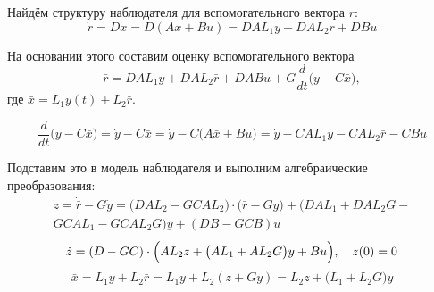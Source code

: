 \documentclass[preprint,russian,a5paper,10pt,twoside,mediummath]{ncc}
\begin{document}
Найдём структуру наблюдателя для вспомогательного вектора $r$: 
\[ \dot{r} = D\dot{x} = D(Ax+Bu) = DAL_1y + DAL_2r + DBu \]

На основании этого составим оценку вспомогательного вектора 
\[ \dot{\bar{r}} = DAL_1y + DAL_2\bar{r} + DABu + G \frac{d}{dt} \bigl( y - C \bar{x} \bigr), \]
где $ \bar{x} = L_1y(t) + L_2\bar{r} $.

\[ \frac{d}{dt} \bigl( y - C\bar{x} \bigr) = \dot{y} - C\dot{\bar{x}} = \dot{y} - C \bigl( A\bar{x} + Bu \bigr) = \dot{y} - CAL_1y - CAL_2\bar{r} - CBu \]

Подставим это в модель наблюдателя и выполним алгебраические преобразования:
\begin{multline*}
\dot{z} = \dot{\bar{r}} - G\dot{y} = \bigl( DAL_2 - GCAL_2 \bigr) \cdot \bigl( \bar{r} - Gy \bigr) + \bigl( DAL_1 + DAL_2G - \\ GCAL_1 - GCAL_2G \bigr) y + ( DB - GCB )u
\end{multline*}
\[ \dot{z} = ( D - GC ) \cdot \Bigl( AL_2z + \bigl( AL_1 + AL_2G \bigr) y + Bu \Bigr), \quad z(0) = 0 \]
\[ \bar{x} = L_1y + L_2\bar{r} = L_1y + L_2 ( z + Gy ) = L_2z + \bigl( L_1 + L_2G \bigr) y \]
\end{document}
